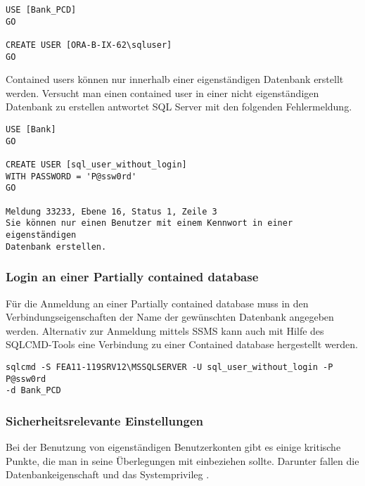             \begin{lstlisting}[language=ms_sql,caption={Erstellen
            eines Windows-Benutzers},label=sql20_05]
USE [Bank_PCD]
GO

CREATE USER [ORA-B-IX-62\sqluser]
GO
            \end{lstlisting}
            Contained users können nur innerhalb einer eigenständigen Datenbank
            erstellt werden. Versucht man einen contained user in einer nicht
            eigenständigen Datenbank zu erstellen antwortet SQL Server mit den
            folgenden Fehlermeldung.
            \begin{lstlisting}[language=ms_sql,caption={Fehler beim Erstellen
            eines SQL Benutzers mit Kennwort in einer nicht
            eigenständigen Datenbank},label=sql20_06]
USE [Bank]
GO

CREATE USER [sql_user_without_login]
WITH PASSWORD = 'P@ssw0rd'
GO

Meldung 33233, Ebene 16, Status 1, Zeile 3
Sie können nur einen Benutzer mit einem Kennwort in einer eigenständigen 
Datenbank erstellen.
            \end{lstlisting}
          \subsubsection{Login an einer Partially contained database}
            Für die Anmeldung an einer Partially contained database muss in den
            Verbindungseigenschaften der Name der gewünschten Datenbank
            angegeben werden.
            Alternativ zur Anmeldung mittels SSMS kann auch mit Hilfe des
            SQLCMD-Tools eine Verbindung zu einer Contained database hergestellt
            werden.
            \begin{lstlisting}[language=terminal,caption={Login an einer
            Partially contained database mit dem SQLCMD-Tool},label=sql20_07]
sqlcmd -S FEA11-119SRV12\MSSQLSERVER -U sql_user_without_login -P P@ssw0rd
-d Bank_PCD
            \end{lstlisting}
            \begin{literaturinternet}
              \item \cite{bmmcspb202ss2pcdp1}
              \item \cite{hh534404}
            \end{literaturinternet}
          \subsubsection{Sicherheitsrelevante Einstellungen}  
            Bei der Benutzung von eigenständigen Benutzerkonten gibt es einige
            kritische Punkte, die man in seine Überlegungen mit einbeziehen
            sollte. Darunter fallen die Datenbankeigenschaft
             und das Systemprivileg .
            

